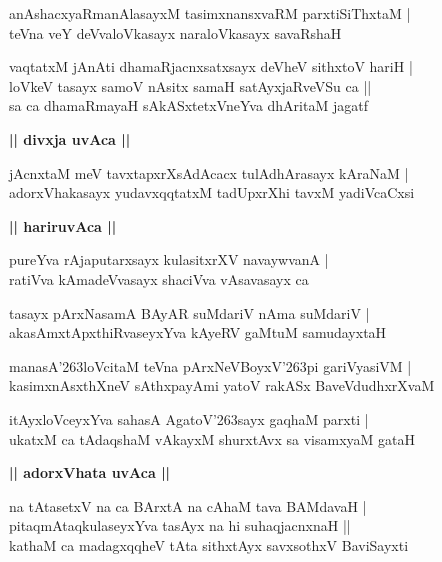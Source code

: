 \documentclass[twoside,12pt,openright]{book}
\def\S{\char'263}
\newcounter{shloka}[chapter]
\def\uvaca#1{\centerline{{\large\textbf{#1}}}}
\begin{document}
\begin{shloka}%
anAshacxyaRmanAlasayxM tasimxnansxvaRM parxtiSiThxtaM |\\
teVna veY deVvaloVkasayx naraloVkasayx savaRshaH 
\end{shloka}

\begin{shloka}%
vaqtatxM jAnAti dhamaRjacnxsatxsayx deVheV sithxtoV hariH |\\
loVkeV tasayx samoV nAsitx samaH satAyxjaRveVSu ca ||\\
sa ca dhamaRmayaH sAkASxtetxVneYva dhAritaM jagatf
\end{shloka}

\uvaca{|| divxja uvAca ||}

\begin{shloka}%
jAcnxtaM meV tavxtapxrXsAdAcacx tulAdhArasayx kAraNaM |\\
adorxVhakasayx yudavxqqtatxM tadUpxrXhi tavxM yadiVcaCxsi
\end{shloka}

\uvaca{|| hariruvAca ||}

\begin{shloka}%
pureYva rAjaputarxsayx kulasitxrXV navaywvanA |\\
ratiVva kAmadeVvasayx shaciVva vAsavasayx ca 
\end{shloka}

\begin{shloka}%
tasayx pArxNasamA BAyAR suMdariV nAma suMdariV |\\
akasAmxtApxthiRvaseyxYva kAyeRV gaMtuM samudayxtaH 
\end{shloka}

\begin{shloka}%
manasA\S loVcitaM teVna pArxNeVBoyxV\S pi gariVyasiVM |\\
kasimxnAsxthXneV sAthxpayAmi yatoV rakASx BaveVdudhxrXvaM 
\end{shloka}

\begin{shloka}%
itAyxloVceyxYva sahasA AgatoV\S sayx gaqhaM parxti |\\
ukatxM ca tAdaqshaM vAkayxM shurxtAvx sa visamxyaM gataH 
\end{shloka}

\uvaca{|| adorxVhata uvAca ||}

\begin{shloka}%
na tAtasetxV na ca BArxtA na cAhaM tava BAMdavaH |\\
pitaqmAtaqkulaseyxYva tasAyx na hi suhaqjacnxnaH ||\\
kathaM ca madagxqqheV tAta sithxtAyx savxsothxV BaviSayxti
\end{shloka}
\end{document}
